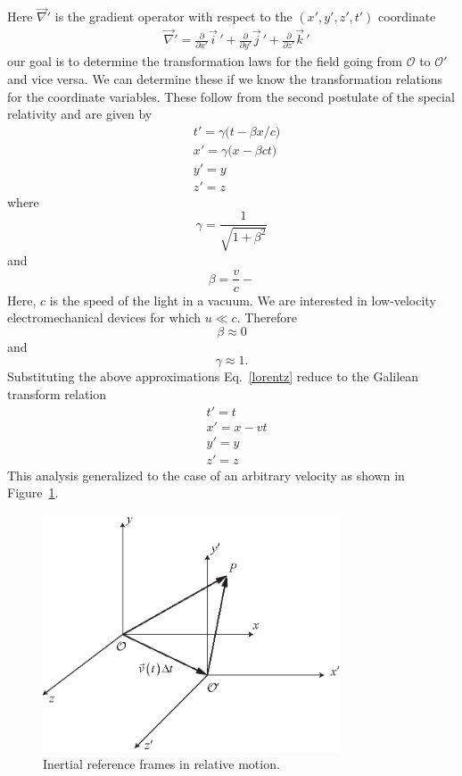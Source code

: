 \documentclass[11pt,a4paper,oneside]{book}
\numberwithin{equation}{section}
\theoremstyle{it}
\theoremstyle{definition}
\begin{document}
Here $\vec{\nabla}'$ is the gradient operator with respect to the 
$(x',y',z',t')$ coordinate
\begin{equation*}
	\begin{aligned}
		&\vec{\nabla}'= \frac{\partial}{\partial 
		x'}\vec{i}\,'+\frac{\partial}{\partial 
		y'}\vec{j}\,'+\frac{\partial}{\partial z'}\vec{k}\,'
	\end{aligned}
\end{equation*} 
our goal is to determine the transformation laws for the field going from 
$\mathcal{O}$ to $\mathcal{O'}$ and vice versa. We can determine these if we 
know the transformation relations for the coordinate variables. These follow 
from the second postulate of the special relativity and are given by
\begin{equation}\label{lorentz}
	\begin{aligned}
		&t'=\gamma\big(t-\beta x/c\big) \\[6pt]
		&x'=\gamma\big(x-\beta ct\big) \\[6pt] 		
		&y'=y \\[6pt]
		&z'=z
	\end{aligned}
\end{equation} 
where $$ \gamma=\frac{1}{\sqrt{1+\beta^2}} $$ and $$\beta=\frac{v}{c}-$$ Here, 
$c$ is the speed of the light in a vacuum. We are interested in low-velocity 
electromechanical devices for which $u\ll c$. Therefore $$\beta\approx 0$$ and 
$$\gamma\approx 1.$$
Substituting the above approximations Eq.~\ref{lorentz} reduce to the Galilean 
transform relation
\begin{equation}\label{galileo}
	\begin{aligned}
		&t'=t \\[6pt]
		&x'=x - vt \\[6pt] 		
		&y'=y \\[6pt]
		&z'=z
	\end{aligned}
\end{equation} 
This analysis generalized to the case of an arbitrary velocity as shown in 
Figure~\ref{inertial_ref_frame_space}.
\begin{figure}[H]
	\centering
	\includegraphics[width = 250pt, angle = 0, 
	keepaspectratio]{figures/appendix/traslating_reference_frame_space.eps}
	\captionsetup{width=0.75\textwidth}		
	\caption{Inertial reference frames in relative motion.}
	\label{inertial_ref_frame_space}
\end{figure}
\end{document}
